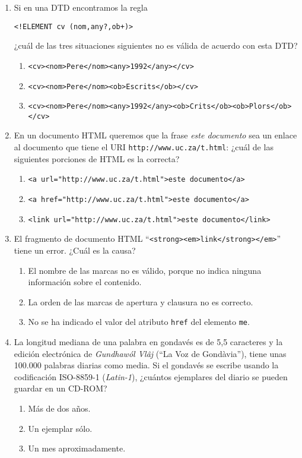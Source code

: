 {\begin{enumerate}
\item Si en una DTD encontramos la regla \begin{center}\verb|<!ELEMENT cv (nom,any?,ob+)>|\end{center} ¿cuál de las tres situaciones siguientes no es válida de acuerdo con esta DTD? \begin{enumerate} \item \verb|<cv><nom>Pere</nom><any>1992</any></cv>| \item \verb|<cv><nom>Pere</nom><ob>Escrits</ob></cv>| \item \verb|<cv><nom>Pere</nom><any>1992</any><ob>Crits</ob><ob>Plors</ob></cv>| \end{enumerate} 

\item En un documento HTML queremos que la frase \emph{este documento} sea un enlace al documento que tiene el URI \verb|http://www.uc.za/t.html|: ¿cuál de las siguientes porciones de HTML es la correcta? \begin{enumerate} \item \verb|<a url="http://www.uc.za/t.html">este documento</a>| \item \verb|<a href="http://www.uc.za/t.html">este documento</a>| \item \verb|<link url="http://www.uc.za/t.html">este documento</link>| \end{enumerate} 

\item El fragmento de documento HTML ``\verb|<strong><em>link</strong></em>|'' tiene un error. ¿Cuál es la causa? \begin{enumerate} \item El nombre de las marcas no es válido, porque no  indica ninguna información sobre el contenido. \item La orden de las marcas de apertura y clausura no es correcto. \item No se ha indicado el valor del atributo \verb|href| del elemento \verb|me|. \end{enumerate} 

\item La longitud mediana de una palabra en gondavés es de 5,5 caracteres y la edición electrónica de \emph{Gundhawól Vlâj} (``La Voz de Gondàvia''), tiene unas 100.000 palabras diarias como media. Si el gondavés se escribe usando la codificación ISO-8859-1 (\emph{Latin-1}), ¿cuántos ejemplares del diario se pueden guardar en un CD-ROM? \begin{enumerate} \item Más de dos años. \item Un ejemplar sólo. \item Un mes aproximadamente. \end{enumerate} 


\end{enumerate}}
